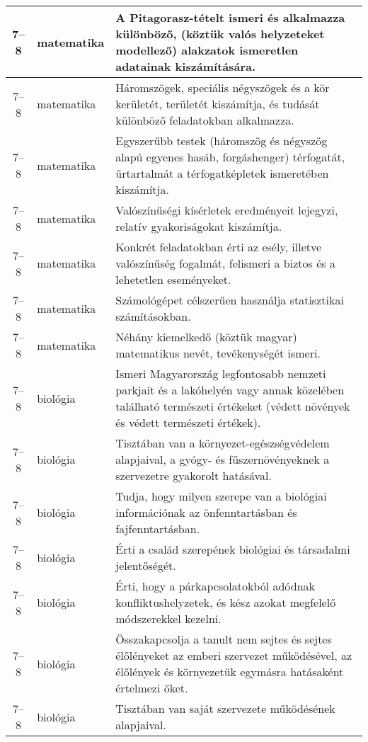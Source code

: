 \begin{small}
\begin{longtable}{c | p{2cm} |  p{11cm} }
              7--8 & matematika & A Pitagorasz-tételt ismeri és alkalmazza különböző, (köztük valós helyzeteket modellező) alakzatok ismeretlen adatainak kiszámítására. \\ \hline
              7--8 & matematika & Háromszögek, speciális négyszögek és a kör kerületét, területét kiszámítja, és tudását különböző feladatokban alkalmazza. \\ \hline
              7--8 & matematika & Egyszerűbb testek (háromszög és négyszög alapú egyenes hasáb, forgáshenger) térfogatát, űrtartalmát a térfogatképletek ismeretében kiszámítja. \\ \hline
              7--8 & matematika & Valószínűségi kísérletek eredményeit lejegyzi, relatív gyakoriságokat kiszámítja. \\ \hline
              7--8 & matematika & Konkrét feladatokban érti az esély, illetve valószínűség fogalmát, felismeri a biztos és a lehetetlen eseményeket. \\ \hline
              7--8 & matematika & Számológépet célszerűen használja statisztikai számításokban. \\ \hline
              7--8 & matematika & Néhány kiemelkedő (köztük magyar) matematikus nevét, tevékenységét ismeri. \\ \hline
              7--8 & biológia & Ismeri Magyarország legfontosabb nemzeti parkjait és a lakóhelyén vagy annak közelében található természeti értékeket (védett növények és védett természeti értékek). \\ \hline
              7--8 & biológia & Tisztában van a környezet-egészségvédelem alapjaival, a gyógy- és fűszernövényeknek a szervezetre gyakorolt hatásával. \\ \hline
              7--8 & biológia & Tudja, hogy milyen szerepe van a biológiai információnak az önfenntartásban és fajfenntartásban. \\ \hline
              7--8 & biológia & Érti a család szerepének biológiai és társadalmi jelentőségét. \\ \hline
              7--8 & biológia & Érti, hogy a párkapcsolatokból adódnak konfliktushelyzetek, és kész azokat megfelelő módszerekkel kezelni. \\ \hline
              7--8 & biológia & Összakapcsolja a tanult nem sejtes és sejtes élőlényeket az emberi szervezet működésével, az élőlények és környezetük egymásra hatásaként értelmezi őket. \\ \hline
              7--8 & biológia & Tisztában van saját szervezete működésének alapjaival. \\ \hline

\end{longtable}
\end{small}
